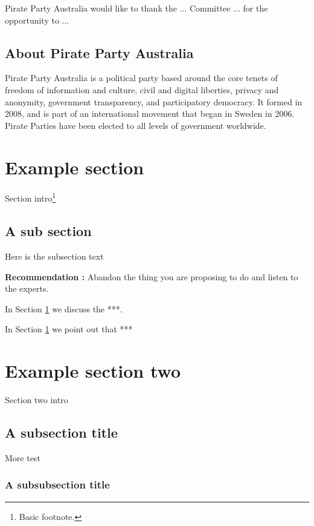\documentclass[a4paper,11pt]{article}
\newcounter{Recommendations}
\newcommand{\recommendation}[1]
{\stepcounter{Recommendations}\textbf{Recommendation \theRecommendations:} #1}
\begin{document}
Pirate Party Australia would like to thank the ... Committee ... for the opportunity to ...

\subsection{About Pirate Party Australia}

Pirate Party Australia is a political party based around the core tenets of freedom of information and culture, civil and digital liberties, privacy and anonymity, government transparency, and participatory democracy. It formed in 2008, and is part of an international movement that began in Sweden in 2006. Pirate Parties have been elected to all levels of government worldwide.

\section{Example section}\label{sec:examplesec}

Section intro\footnote{Basic footnote.}

\subsection{A sub section}

Here is the subsection text

\vspace{1em}
\begin{framed}
\recommendation{Abandon the thing you are proposing to do and listen to the experts.}
\end{framed}

In Section \ref{sec:examplesec} we discuss the ***.

In Section \ref{sec:examplesec} we point out that ***

\section{Example section two}\label{sec:examplesectwo}

Section two intro

\subsection{A subsection title}

More test\cite{alrc}

\subsubsection{A subsubsection title}
\end{document}
